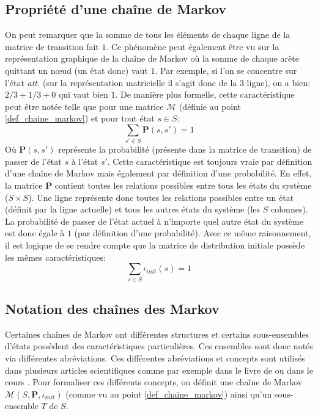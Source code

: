 \documentclass[letterpaper]{article}
\begin{document}
  \subsection{Propriété d'une chaîne de Markov}
    On peut remarquer que la somme de tous les éléments de chaque ligne de la
    matrice de transition fait $1$.  Ce phénomène peut également être vu
    sur la représentation graphique de la chaîne de Markov où la somme de chaque
    arête quittant un nœud (un état donc) vaut $1$.  Par exemple, si l'on se
    concentre sur l'état \textit{att.} (sur la représentation matricielle il s'agit donc 
    de la 3 ligne), on a bien: $2/3 + 1/3 + 0$ qui vaut bien $1$.  De manière 
    plus formelle, cette caractéristique peut être notée telle que pour une matrice
    $\mathcal{M}$ (définie au point \ref{def_chaine_markov}) et pour tout état $s \in S$:
    $$\sum\limits_{s' \in S} \mathbf{P}(s, s') = 1$$
    Où $\mathbf{P}(s, s')$ représente la probabilité (présente dans la matrice de
    transition) de passer de l'état $s$ à l'état $s'$.  Cette caractéristique est
    toujours vraie par définition d'une chaîne de Markov mais également par définition
    d'une probabilité.
    En effet, la matrice $\mathbf{P}$ contient toutes les relations possibles entre
    tous les états du système ($S \times S$).  Une ligne représente donc toutes les 
    relations possibles entre un état (définit par la ligne actuelle) et tous les autres
    états du système (les $S$ colonnes).  La probabilité de passer de l'état actuel
    à n'importe quel autre état du système est donc égale à $1$ (par définition d'une probabilité).
    Avec ce même raisonnement, il est logique de se rendre compte que la matrice
    de distribution initiale possède les mêmes caractéristiques:
    $$\sum\limits_{s \in S} \iota_{init}(s) = 1$$
    
  \subsection{Notation des chaînes des Markov}
    Certaines chaînes de Markov ont différentes structures et certains
    sous-ensembles d'états possèdent des caractéristiques particulières.
    Ces ensembles sont donc notés via différentes abréviations.  Ces différentes
    abréviations et concepts sont utilisés dans plusieurs articles scientifiques
    comme par exemple dans le livre de \citet{ModelChecking} ou dans le cours
    \citet{COURS}.  Pour formaliser ces différents concepts, on définit 
    une chaîne de Markov $\mathcal{M}(S, \mathbf{P}, \iota_{init})$ 
    (comme vu au point \ref{def_chaine_markov}) ainsi qu'un sous-ensemble $T$ de $S$.
    
\end{document}
